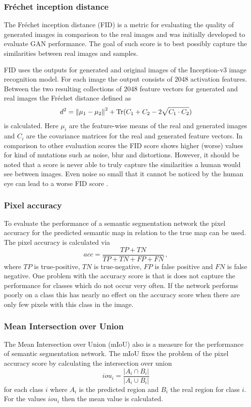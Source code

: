 \subsubsection{Fréchet inception distance} \label{fid}
The Fréchet inception distance (FID) \cite{fid} is a metric for evaluating the quality of generated images in comparison to the real images and was initially developed to evaluate GAN performance. The goal of such score is to best possibly capture the similarities between real images and samples.

FID uses the outputs for generated and original images of the Inception-v3 \cite{inception-v3} image recognition model. For each image the output consists of $2048$ activation features. Between the two resulting collections of $2048$ feature vectors for generated and real images the Fréchet distance defined as 
%
\begin{equation}
    d^2=\left\lVert\mu_1-\mu_2\right\rVert^2+\text{Tr}(C_1+C_2-2\sqrt{C_1\cdot C_2})
\end{equation}
%
is calculated. Here $\mu_i$ are the feature-wise means of the real and generated images and $C_i$ are the covariance matrices for the real and generated feature vectors. In comparison to other evaluation scores the FID score shows higher (worse) values for  kind of mutations such as noise, blur and distortions. However, it should be noted that a score is never able to truly capture the similarities a human would see between images. Even noise so small that it cannot be noticed by the human eye can lead to a worse FID score \cite{score_4}.

\subsubsection{Pixel accuracy}
To evaluate the performance of a semantic segmentation network the pixel accuracy for the predicted semantic map in relation to the true map can be used. The pixel accuracy is calculated via
%
\begin{equation}
    acc=\frac{TP+TN}{TP+TN+FP+FN}\,,
\end{equation}
%
where $TP$ is true-positive, $TN$ is true-negative, $FP$ is false positive and $FN$ is false negative. One problem with the accuracy score is that is does not capture the performance for classes which do not occur very often. If the network performs poorly on a class this has nearly no effect on the accuracy score when there are only few pixels with this class in the image.
%
\subsubsection{Mean Intersection over Union}
The Mean Intersection over Union (mIoU) also is a measure for the performance of semantic segmentation network. The mIoU fixes the problem of the pixel accuracy score by calculating the intersection over union
%
\begin{equation}
    iou_{i}=\frac{|A_i\cap B_i|}{|A_i \cup B_i|}
\end{equation}
%
for each class $i$ where $A_i$ is the predicted region and $B_i$ the real region for class $i$. For the values $iou_i$ then the mean value is calculated.
%
